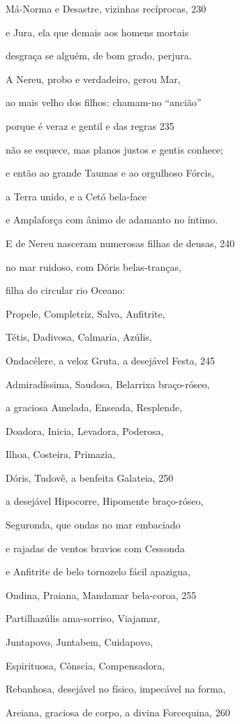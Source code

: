 Má-Norma e Desastre, vizinhas recíprocas, \num{230}

e Jura, ela que demais aos homens mortais

desgraça se alguém, de bom grado, perjura.

\medskip

A Nereu, probo e verdadeiro, gerou Mar,

ao mais velho dos filhos: chamam-no ``ancião''

porque é veraz e gentil e das regras \num{235}

não se esquece, mas planos justos e gentis conhece;

e então ao grande Taumas e ao orgulhoso Fórcis,

a Terra unido, e a Cetó bela-face

e Amplaforça com ânimo de adamanto no íntimo.

E de Nereu nasceram numerosas filhas de deusas, \num{240}

no mar ruidoso, com Dóris belas-tranças,

filha do circular rio Oceano:

Propele, Completriz, Salva, Anfitrite,

Tétis, Dadivosa, Calmaria, Azúlis,

Ondacélere, a veloz Gruta, a desejável Festa, \num{245}

Admiradíssima, Saudosa, Belarrixa braço-róseo,

a graciosa Amelada, Enseada, Resplende,

Doadora, Inicia, Levadora, Poderosa,

Ilhoa, Costeira, Primazia,

Dóris, Tudovê, a benfeita Galateia, \num{250}

a desejável Hipocorre, Hipomente braço-róseo,

Seguronda, que ondas no mar embaciado

e rajadas de ventos bravios com Cessonda

e Anfitrite de belo tornozelo fácil apazigua,

Ondina, Praiana, Mandamar bela-coroa, \num{255}

Partilhazúlis ama-sorriso, Viajamar,

Juntapovo, Juntabem, Cuidapovo,

Espirituosa, Cônscia, Compensadora,

Rebanhosa, desejável no físico, impecável na forma,

Areiana, graciosa de corpo, a divina Forcequina, \num{260}

